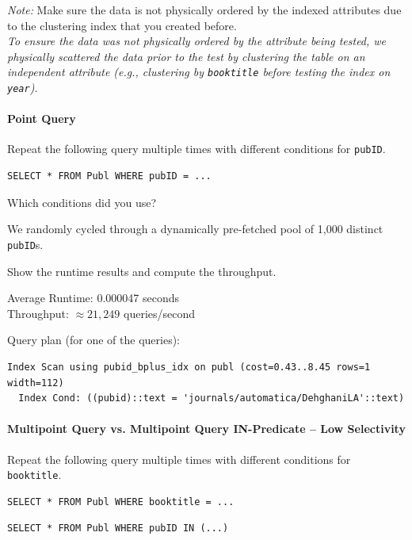 \documentclass[11pt]{scrartcl}
\begin{document}
\emph{Note:} Make sure the data is not physically ordered by the indexed attributes due to the clustering index that you created before. \\
\emph{To ensure the data was not physically ordered by the attribute being tested, we physically scattered the data prior to the test by clustering the table on an independent attribute (e.g., clustering by \texttt{booktitle} before testing the index on \texttt{year}).}

\paragraph{Point Query}

Repeat the following query multiple times with different conditions for \texttt{pubID}.

\begin{lstlisting}[style=dbtsql]
SELECT * FROM Publ WHERE pubID = ...
\end{lstlisting}

Which conditions did you use?

We randomly cycled through a dynamically pre-fetched pool of 1,000 distinct \texttt{pubID}s.

Show the runtime results and compute the throughput.

Average Runtime: 0.000047 seconds \\
Throughput: $\approx 21,249$ queries/second

Query plan (for one of the queries):

{\small
\parskip0pt\begin{verbatim}
Index Scan using pubid_bplus_idx on publ (cost=0.43..8.45 rows=1 width=112)
  Index Cond: ((pubid)::text = 'journals/automatica/DehghaniLA'::text)
\end{verbatim}}

\paragraph{Multipoint Query vs. Multipoint Query IN-Predicate -- Low Selectivity}

Repeat the following query multiple times with different conditions for \texttt{booktitle}.

\begin{lstlisting}[style=dbtsql]
SELECT * FROM Publ WHERE booktitle = ...
\end{lstlisting}

\begin{lstlisting}[style=dbtsql]
SELECT * FROM Publ WHERE pubID IN (...)
\end{lstlisting}
\end{document}
